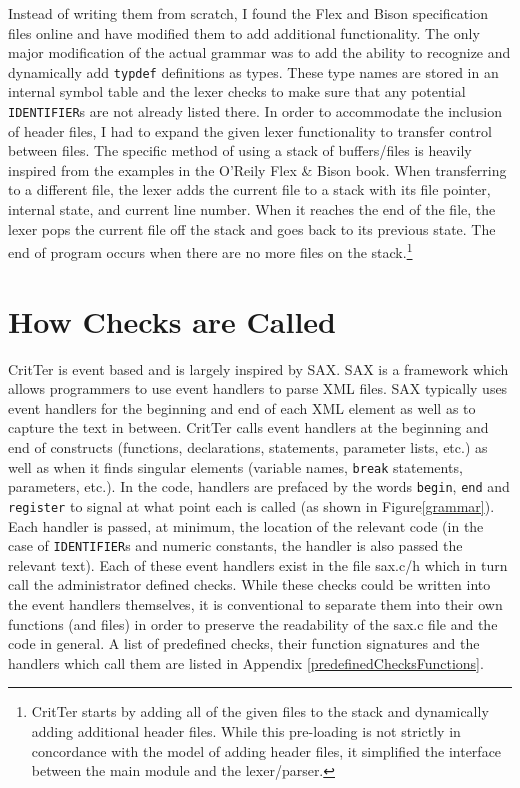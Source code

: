 \documentclass[12pt]{report}
\def\lstlistingname{Figure}
\newcommand{\refCode}{\lstlistingname \hspace{1mm}}
\newcommand{\programName}{CritTer\xspace}
\begin{document}
Instead of writing them from scratch, I found the Flex and Bison specification files 
online\cite{originalGrammar} and have modified them to add additional functionality. The only major 
modification of the actual grammar was to add the ability to recognize and dynamically add 
\lstinline{typdef} definitions as types. These type names are stored in an internal symbol table and the 
lexer checks to make sure that any potential \lstinline{IDENTIFIER}s are not already listed there. In 
order to accommodate the inclusion of header files, I had to expand the given lexer functionality to 
transfer control between files. The specific method of using a stack of buffers/files is heavily inspired 
from the examples in the O'Reily Flex \& Bison book\cite{flex-and-bison}. When transferring to a 
different file, the lexer adds the current file to a stack with its file pointer, internal state, and current line 
number. When it reaches the end of the file, the lexer pops the current file off the stack and goes back 
to its previous state. The end of program occurs when there are no more files on the 
stack.\footnote{\programName starts by adding all of the given files to the stack and dynamically adding 
additional header files. While this pre-loading is not strictly in concordance with the model of adding 
header files, it simplified the interface between the main module and the lexer/parser.} 


\section{How Checks are Called}
\label{howChecksAreCalled}

\programName is event based and is largely inspired by SAX\cite{saxHomepage}. SAX is a 
framework which allows programmers to use event handlers to parse XML files. SAX typically uses
event handlers for the beginning and end of each XML element as well as to capture the text in 
between. \programName calls event handlers at the beginning and end of constructs (functions, 
declarations, statements, parameter lists, etc.) as well as when it finds singular elements (variable 
names, \lstinline{break} statements, parameters, etc.). In the code, handlers are prefaced by the words 
\lstinline{begin}, \lstinline{end} and \lstinline{register} to signal at what point each is called (as shown 
in \refCode \ref{grammar}). Each handler is passed, at minimum, the location of the relevant code (in 
the case of \lstinline{IDENTIFIER}s and numeric constants, the handler is also passed the relevant 
text). Each of these event handlers exist in the file sax.c/h which in turn call the administrator defined 
checks. While these checks could be written into the event handlers themselves, it is conventional to 
separate them into their own functions (and files) in order to preserve the readability of the sax.c file 
and the code in general. A list of predefined checks, their function signatures and the handlers which 
call them are listed in Appendix \ref{predefinedChecksFunctions}.
\end{document}
